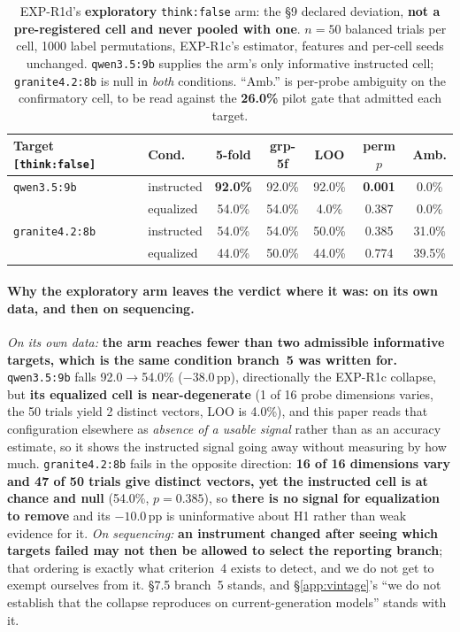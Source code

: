 \begin{table}[h]
\centering
\small
\begin{tabular}{@{}llccccc@{}}
\toprule
\textbf{Target} \texttt{[think:false]} & \textbf{Cond.} & \textbf{5-fold} & \textbf{grp-5f} & \textbf{LOO} & \textbf{perm $p$} & \textbf{Amb.} \\
\midrule
\texttt{qwen3.5:9b}    & instructed & \textbf{92.0\%} & 92.0\% & 92.0\% & \textbf{0.001} & \phantom{0}0.0\% \\
                       & equalized  & 54.0\% & 54.0\% & \phantom{0}4.0\% & 0.387 & \phantom{0}0.0\% \\
\texttt{granite4.2:8b} & instructed & 54.0\% & 54.0\% & 50.0\% & 0.385 & 31.0\% \\
                       & equalized  & 44.0\% & 50.0\% & 44.0\% & 0.774 & 39.5\% \\
\bottomrule
\end{tabular}
\caption{EXP-R1d's \textbf{exploratory} \texttt{think:false} arm: the §9 declared deviation, \textbf{not a pre-registered cell and never pooled with one}. $n=50$ balanced trials per cell, 1000 label permutations, EXP-R1c's estimator, features and per-cell seeds unchanged. \texttt{qwen3.5:9b} supplies the arm's only informative instructed cell; \texttt{granite4.2:8b} is null in \emph{both} conditions. ``Amb.'' is per-probe ambiguity on the confirmatory cell, to be read against the \textbf{26.0\%} pilot gate that admitted each target.}
\label{tab:r1d_thinkoff}
\end{table}

\paragraph{Why the exploratory arm leaves the verdict where it was: on its own data, and then on sequencing.} \emph{On its own data:} \textbf{the arm reaches fewer than two admissible informative targets, which is the same condition branch~5 was written for.} \texttt{qwen3.5:9b} falls 92.0$\to$54.0\% ($-38.0$\,pp), directionally the EXP-R1c collapse, but \textbf{its equalized cell is near-degenerate} (1 of 16 probe dimensions varies, the 50 trials yield 2 distinct vectors, LOO is 4.0\%), and this paper reads that configuration elsewhere as \emph{absence of a usable signal} rather than as an accuracy estimate, so it shows the instructed signal going away without measuring by how much. \texttt{granite4.2:8b} fails in the opposite direction: \textbf{16 of 16 dimensions vary and 47 of 50 trials give distinct vectors, yet the instructed cell is at chance and null} (54.0\%, $p=0.385$), so \textbf{there is no signal for equalization to remove} and its $-10.0$\,pp is uninformative about H1 rather than weak evidence for it. \emph{On sequencing:} \textbf{an instrument changed after seeing which targets failed may not then be allowed to select the reporting branch}; that ordering is exactly what criterion~4 exists to detect, and we do not get to exempt ourselves from it. §7.5 branch~5 stands, and §\ref{app:vintage}'s ``we do not establish that the collapse reproduces on current-generation models'' stands with it.

